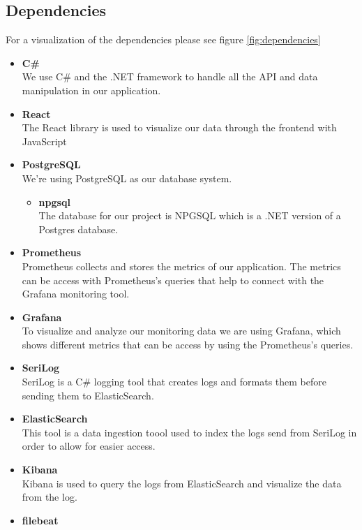 \documentclass{article}
\begin{document}
\subsection{Dependencies}
For a visualization of the dependencies please see figure \ref{fig:dependencies}
\begin{itemize}
    \item \textbf{C\#} \cite{Csharp}\\
    We use C\# and the .NET framework to handle all the API and data manipulation in our application. 
    \item \textbf{React} \cite{react}\\
    The React library is used to visualize our data through the frontend with JavaScript
    \item \textbf{PostgreSQL} \cite{postgresql}\\
    We're using PostgreSQL as our database system.
    \begin{itemize}
        \item \textbf{npgsql} \cite{npgsql}\\
        The database for our project is NPGSQL which is a .NET version of a Postgres database.
    \end{itemize}
    \item \textbf{Prometheus} \cite{prometheus}\\
    Prometheus collects and stores the metrics of our application. The metrics can be access with Prometheus's queries that help to connect with the Grafana monitoring tool. 
    \item \textbf{Grafana} \cite{grafana}\\
    To visualize and analyze our monitoring data we are using Grafana, which shows different metrics that can be access by using the Prometheus's queries.
    \item \textbf{SeriLog} \cite{seriLog}\\
    SeriLog is a C\# logging tool that creates logs and formats them before sending them to ElasticSearch.
    \item \textbf{ElasticSearch} \cite{elasticsearch}\\
    This tool is a data ingestion toool used to index the logs send from SeriLog in order to allow for easier access.
    \item \textbf{Kibana} \cite{kibana}\\
    Kibana is used to query the logs from ElasticSearch and visualize the data from the log.
    \item \textbf{filebeat} \cite{filebeat}\\

\end{itemize}
\end{document}
